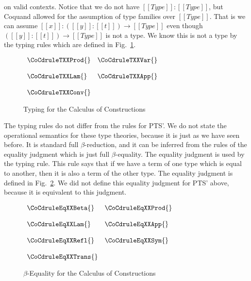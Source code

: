 on valid contexts. Notice that we do not have $[[Type]]:[[Type]]$, but
Coquand allowed for the assumption of type families over $[[Type]]$.
That is we can assume $[[x]]:([[y]] : [[t]]) \to [[Type]]$ even though
$([[y]] : [[t]]) \to [[Type]]$ is not a type.  We know this is
not a type by the typing rules which are defined in
Fig.~\ref{fig:CoC_typing}.
\begin{figure}
  \begin{center}
    \begin{math}
      \begin{array}{lll}
        \CoCdruleTXXProd{} & \CoCdruleTXXVar{}\\
        &\\
        \CoCdruleTXXLam{} & \CoCdruleTXXApp{}\\
        &\\
        \CoCdruleTXXConv{}
      \end{array}
    \end{math}
  \end{center}
  \caption{Typing for the Calculus of Constructions}
  \label{fig:CoC_typing}
\end{figure}

The typing rules do not differ from the rules for PTS'.  We do not
state the operational semantics for these type theories, because it is
just as we have seen before.  It is standard full $\beta$-reduction,
and it can be inferred from the rules of the equality judgment which
is just full $\beta$-equality.  The equality judgment is used by the
 typing rule.  This rule says that if we have a
term of one type which is equal to another, then it is also a term of
the other type.  The equality judgment is defined in
Fig.~\ref{fig:CoC_beta_eq}.  We did not define this equality judgment
for PTS' above, because it is equivalent to this judgment.
\begin{figure}
  \begin{center}
    \begin{math}
      \begin{array}{lll}
        \CoCdruleEqXXBeta{} & \CoCdruleEqXXProd{}\\
        &\\
        \CoCdruleEqXXLam{} & \CoCdruleEqXXApp{}\\
        &\\
        \CoCdruleEqXXRefl{} & \CoCdruleEqXXSym{}\\
        &\\
        \CoCdruleEqXXTrans{}
      \end{array}
    \end{math}
  \end{center}
  \caption{$\beta$-Equality for the Calculus of Constructions}
  \label{fig:CoC_beta_eq}
\end{figure}
